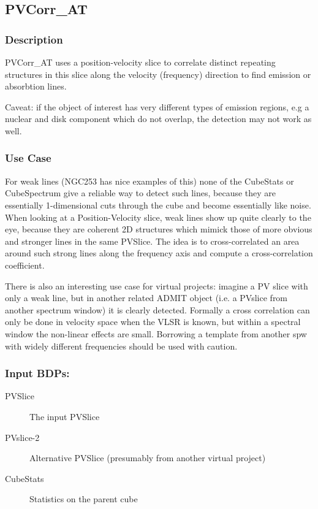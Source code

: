 
\subsection{PVCorr\_AT}

\subsubsection{Description}

PVCorr\_AT uses a position-velocity slice to correlate distinct repeating
structures in this slice along the velocity (frequency) direction to find
emission or absorbtion lines.

Caveat: if the object of interest has very different types of emission regions,
e.g a nuclear and disk component which do not overlap, the detection may not work
as well.

\subsubsection{Use Case}

For weak lines (NGC253 has nice examples of this) none of the CubeStats or CubeSpectrum give
a reliable way to detect such lines, because they are essentially 1-dimensional cuts through the
cube and become essentially like noise.  
When looking at a Position-Velocity slice, weak lines show up quite clearly to the eye,
because they are coherent 2D structures which mimick those of more obvious and stronger lines
in the same PVSlice. The idea is to cross-correlated an area around such strong lines along the
frequency axis and compute a cross-correlation coefficient.

There is also an interesting use case for virtual projects: imagine a PV slice with only
a weak line, but in another related ADMIT object (i.e. a PVslice from another spectrum window) it 
is clearly detected. Formally a cross correlation can only be done in velocity space when the
VLSR is known, but within a spectral window the non-linear effects are small. Borrowing a
template from another spw with widely different frequencies should be used with caution.

\subsubsection{Input BDPs:}

\begin{description}

\item[PVSlice] The input PVSlice

\item[PVslice-2] Alternative PVSlice (presumably from another virtual project)

\item[CubeStats] Statistics on the parent cube

\end{description}


